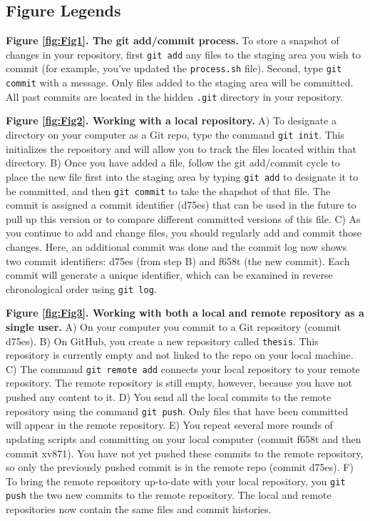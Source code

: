 \documentclass[10pt]{article}
\begin{document}
  


\subsection{Figure Legends}

\textbf{Figure \ref{fig:Fig1}. The git add/commit process.}
To store a snapshot of changes in your repository, first \verb|git add| any files to the staging area you wish to commit (for example, you've updated the \verb|process.sh| file).
Second, type \verb|git commit| with a message. Only files added to the staging area will be committed.
All past commits are located in the hidden \verb|.git| directory in your repository.

\textbf{Figure \ref{fig:Fig2}. Working with a local repository.}
A) To designate a directory on your computer as a Git repo, type the command \verb|git init|.
This initializes the repository and will allow you to track the files located within that directory.
B) Once you have added a file, follow the git add/commit cycle to place the new file first into the staging area by typing \verb|git add| to designate it to be committed, and then \verb|git commit| to take the shapshot of that file.
The commit is assigned a commit identifier (d75es) that can be used in the future to pull up this version or to compare different committed versions of this file.
C) As you continue to add and change files, you should regularly add and commit those changes.
Here, an additional commit was done and the commit log now shows two commit identifiers: d75es (from step B) and f658t (the new commit).
Each commit will generate a unique identifier, which can be examined in reverse chronological order using \verb|git log|.

\textbf{Figure \ref{fig:Fig3}. Working with both a local and remote repository as a single user.}
A) On your computer you commit to a Git repository (commit d75es).
B) On GitHub, you create a new repository called \verb|thesis|.
This repository is currently empty and not linked to the repo on your local machine.
C) The command \verb|git remote add| connects your local repository to your remote repository.
The remote repository is still empty, however, because you have not pushed any content to it.
D) You send all the local commits to the remote repository using the command \verb|git push|.
Only files that have been committed will appear in the remote repository.
E) You repeat several more rounds of updating scripts and committing on your local computer (commit f658t and then commit xv871).
You have not yet pushed these commits to the remote repository, so only the previously pushed commit is in the remote repo (commit d75es).
F) To bring the remote repository up-to-date with your local repository, you \verb|git push| the two new commits to the remote repository.
The local and remote repositories now contain the same files and commit histories.
\end{document}
